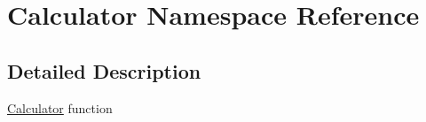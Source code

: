 \hypertarget{namespace_calculator}{}\section{Calculator Namespace Reference}
\label{namespace_calculator}


\subsection{Detailed Description}
\hyperlink{namespace_calculator}{Calculator} function 